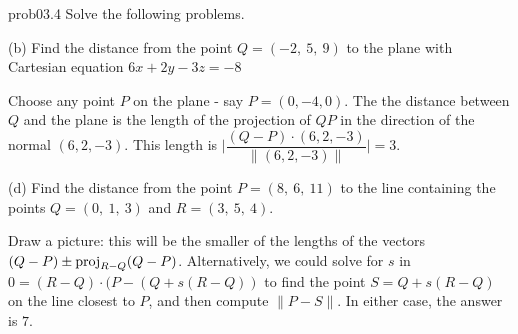\begin{sol}{prob03.4}  Solve the following problems. \medskip



(b)  Find the distance from the point $Q=(-2,\ 5,\ 9)$ to the plane with Cartesian equation
$6x+2y-3z=-8$ 

\soln Choose any point $P$ on the plane - say $P=(0,-4,0)$. The the distance between $Q$ and the plane is the length of the projection of $QP$ in the direction of the normal $(6,2,-3)$. This length is $\Big|\dfrac{(Q-P)\cdot(6,2,-3)}{\|(6,2,-3)\|}\Big|=3.$ \medskip

\medskip


(d)  Find the distance from the point $P=(8,\ 6,\ 11)$ to the
line containing the points $Q=(0,\ 1,\ 3)$ and $R=(3,\ 5,\ 4)$. 

\soln Draw a picture: this will be the smaller of the lengths of the vectors $(Q-P)\pm \operatorname{proj}_{R-Q}(Q-P)$. Alternatively, we could solve for $s$ in $0=(R-Q)\cdot(P-(Q+ s (R-Q))$ to find the point $S=Q+ s (R-Q)$ on the line closest to $P$, and then compute $\|P-S \|$. In either case, the answer is $7$. \medskip





\end{sol} 


